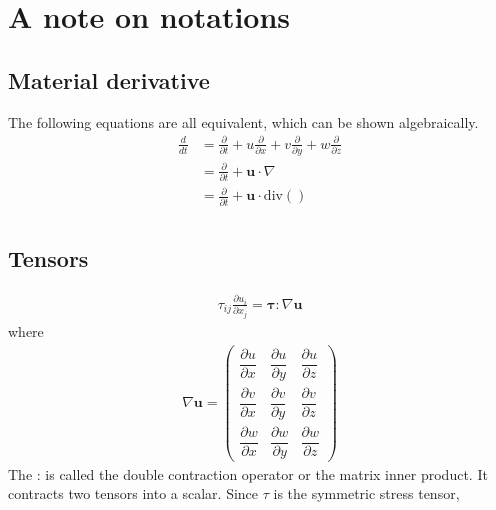 \documentclass[document.tex]{subfiles}
\begin{document}
    \section{A note on notations}
\subsection{Material derivative} \label{eq:material_derivative}
The following equations are all equivalent, which can be shown algebraically. 
\begin{align*}
\frac{d}{dt} &= \frac{\partial}{\partial t}+ u \frac{\partial}{\partial x} + v \frac{\partial}{\partial y} + w\frac{\partial}{\partial z}\\
&= \frac{\partial}{\partial t} + \textbf{u}\cdot \nabla \\
&= \frac{\partial}{\partial t} + \textbf{u}\cdot \text{div}() \\
\end{align*}

\subsection{Tensors} \label{tensors}
\begin{align*}
\tau	_{ij}\frac{\partial u_i}{\partial x_j} = \boldsymbol{\tau}:\nabla\textbf{u}
\end{align*}
where 
\begin{align*}
\nabla\mathbf{u} =
\begin{pmatrix}
\dfrac{\partial u}{\partial x} & \dfrac{\partial u}{\partial y} & \dfrac{\partial u}{\partial z} \\[2mm]
\dfrac{\partial v}{\partial x} & \dfrac{\partial v}{\partial y} & \dfrac{\partial v}{\partial z} \\[2mm]
\dfrac{\partial w}{\partial x} & \dfrac{\partial w}{\partial y} & \dfrac{\partial w}{\partial z}
\end{pmatrix}
\end{align*}
The : is called the double contraction operator or the matrix inner product. It contracts two tensors into a scalar. 
Since $\tau$ is the symmetric stress tensor, 
\end{document}
